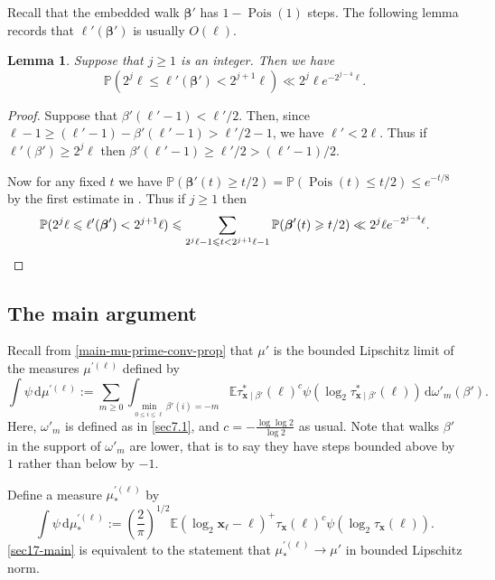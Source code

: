 \documentclass[11pt,reqno]{amsart}
\numberwithin{equation}{section}
\newtheorem{lemma}[theorem]{Lemma}
\theoremstyle{definition}
\theoremstyle{remark}
\newcommand{\mb}{\mathbb}
\newcommand{\mbf}{\mathbf}
\newcommand\Pois{\operatorname{Pois}}
\def\boldbeta{\boldsymbol\beta}
\renewcommand{\le}{\leqslant}
\renewcommand{\ge}{\geqslant}
\begin{document}
Recall that the embedded walk $\boldbeta'$ has $1 - \Pois(1)$ steps. The following lemma records that $\ell'(\boldbeta')$ is usually $O(\ell)$.

\begin{lemma}\label{dyadic-ell-dash} Suppose that $j \ge 1$ is an integer. Then we have 
\[ \mb{P}(2^j \ell \le \ell'(\boldbeta') < 2^{j+1} \ell) \ll 2^j \ell e^{-2^{j - 4} \ell}.\]
\end{lemma}
\begin{proof} Suppose that $\beta'(\ell'-1) <  \ell'/2$. Then, since $\ell - 1 \ge (\ell'-1) - \beta'(\ell'-1) > \ell'/2 - 1$, we have $\ell' < 2\ell$. Thus if $\ell'(\beta') \ge 2^{j} \ell$ then $\beta'(\ell'-1) \ge  \ell'/2 > (\ell' - 1)/2$. 

Now for any fixed $t$ we have $\mb{P}(\boldbeta'(t) \ge t/2) = \mb{P}(\Pois(t) \le t/2) \le e^{-t/8}$ by the first estimate in \cite[Theorem A.1.15]{alon-spencer}. Thus if $j \ge 1$ then
\[ \mb{P}(2^j\ell \le \ell'(\boldbeta') < 2^{j + 1} \ell) \le \sum_{2^j\ell - 1 \le t < 2^{j+1}\ell - 1} \mb{P}(\boldbeta'(t) \ge t/2)  \ll 2^j \ell e^{-2^{j-4} \ell}.\qedhere
\]
\end{proof}

\subsection{The main argument}

Recall from \cref{main-mu-prime-conv-prop} that $\mu'$ is the bounded Lipschitz limit of the measures $\mu^{\prime (\ell)}$ defined by
\begin{equation}\label{mu-prime-ell-def-rpt} \int \psi \, \mathrm{d} \mu^{\prime (\ell)} := \sum_{m \ge 0}\int_{\min_{0 \le i \le \ell} \beta'(i) = -m} \mb{E} \tau^*_{\mbf{x} \mid \beta'}(\ell)^c \psi (\log_2 \tau^*_{\mbf{x} \mid \beta'}(\ell)) \, \mathrm{d}\omega'_m(\beta').\end{equation} 
Here, $\omega'_m$ is defined as in \cref{sec7.1}, and $c = -\frac{\log \log 2}{\log 2}$ as usual. Note that walks $\beta'$ in the support of $\omega'_m$ are lower, that is to say they have steps bounded above by $1$ rather than below by $-1$. 

Define a measure $\mu^{\prime(\ell)}_*$ by
\begin{equation}\label{mu-prime-ell-star-def} \int \psi \, \mathrm{d}\mu^{\prime(\ell)}_* := (\frac{2}{\pi})^{1/2}  \mb{E} (\log_2 \mbf{x}_{\ell} - \ell)^+ \tau_{\mbf{x}}(\ell)^c \psi(\log_2 \tau_{\mbf{x}}(\ell)).\end{equation} \cref{sec17-main} is equivalent to the statement that $\mu^{\prime (\ell)}_* \rightarrow \mu'$ in bounded Lipschitz norm.
\end{document}
